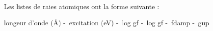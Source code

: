 \documentclass{article}
\begin{document}
 Les listes de raies atomiques ont la forme suivante :  \newline

 longeur d'onde (Å) -\ excitation (eV) -\ log gf -\ log gf -\ fdamp -\ gup \newline

\end{document}
